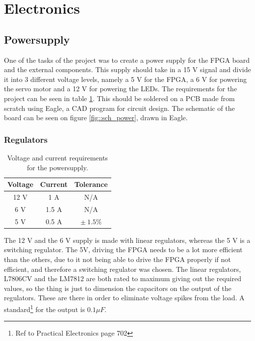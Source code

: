 \section{Electronics}
\subsection{Powersupply}
One of the tasks of the project was to create a power supply for the FPGA board and the external components. This supply should take in a 15 V signal and divide it into 3 different voltage levels, namely a 5 V for the FPGA, a 6 V for powering the servo motor and a 12 V for powering the LEDs. The requirements for the project can be seen in table \ref{tab::power_req}. This should be soldered on a PCB made from scratch using Eagle, a CAD program for circuit design. The schematic of the board can be seen on figure \ref{fig::sch_power}, drawn in Eagle.
\subsubsection{Regulators}
\begin{table}
\caption{Voltage and current requirements for the powersupply.}
\label{tab::power_req}
 \vspace{5 pt}
 \begin{tabular}{ccc}
  Voltage & Current & Tolerance \\
 \toprule
  12 V & 1 A & N/A \\
  6 V & 1.5 A & N/A \\
  5 V & 0.5 A & $\pm\ 1.5 \%$ \\
  \bottomrule
 \end{tabular}
\end{table}
The 12 V and the 6 V supply is made with linear regulators, whereas the 5 V is a switching regulator. The 5V, driving the FPGA needs to be a lot more efficient than the others, due to it not being able to drive the FPGA properly if not efficient, and therefore a switching regulator was chosen. The linear regulators, L7806CV and the LM7812 are both rated to maximum giving out the required values, so the thing is just to dimension the capacitors on the output of the regulators. These are there in order to eliminate voltage spikes from the load. A standard\footnote{Ref to Practical Electronics page 702} for the output is $0.1 \mu F$.

